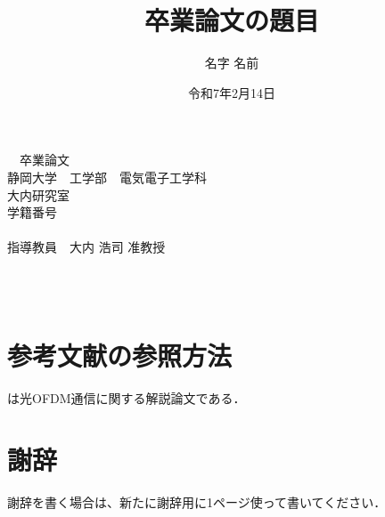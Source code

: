 \documentclass[fleqn, a4paper, titlepage, 11pt]{ltjsarticle}
\title{卒業論文の題目}
\date{令和7年2月14日}
\author{名字 名前}
\numberwithin{figure}{section}  %
\numberwithin{table}{section}  %
\numberwithin{equation}{section}  %
\begin{document}
\begin{titlepage}
	\begin{center}
		\vspace*{3.5cm}
		{\LARGE \thegraduateyear　卒業論文\\}
		\vspace{1cm}
		\textgt{\huge \thetitle\\}
		\vspace{4cm}
		{\LARGE
			静岡大学　工学部　電気電子工学科\\
			大内研究室\\
			学籍番号　\thestudentnumber\\
			\theauthor\\
			指導教員　大内 浩司 准教授\\
		}
		\vspace{2cm}
		{\LARGE \thedate\\}
	\end{center}
\end{titlepage}
\newpage
\thispagestyle{empty}
~\\
\newpage
\tableofcontents %
\setcounter{page}{1}  %
\newpage

\section{参考文献の参照方法}
\cite{ohuchi2019}は光OFDM通信に関する解説論文である．

\newpage
\section*{謝辞}
謝辞を書く場合は、新たに謝辞用に1ページ使って書いてください．

\newpage
\end{document}
